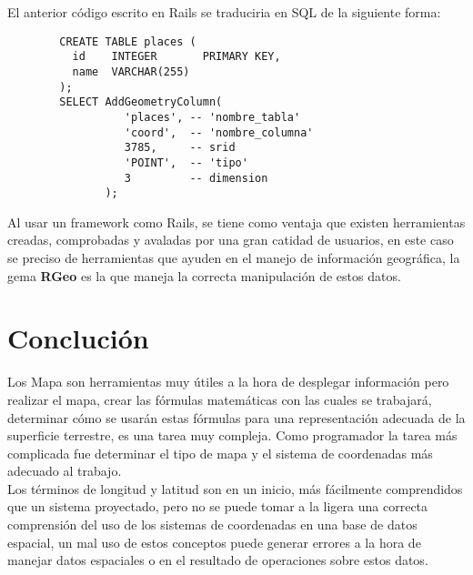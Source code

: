     El anterior código escrito en Rails se traduciria en SQL de la siguiente forma: 
    \begin{center}
      \begin{verbatim}
        CREATE TABLE places (
          id    INTEGER       PRIMARY KEY,
          name  VARCHAR(255)
        );
        SELECT AddGeometryColumn(
                  'places', -- 'nombre_tabla'
                  'coord',  -- 'nombre_columna'
                  3785,     -- srid
                  'POINT',  -- 'tipo'
                  3         -- dimension
               );
      \end{verbatim}
    \end{center}
    Al usar un framework como Rails, se tiene como ventaja que existen herramientas creadas, comprobadas y avaladas por una gran catidad de usuarios, en este caso se preciso de herramientas que ayuden en el  manejo de informaci\'on geogr\'afica, la gema \textbf{RGeo} es la que maneja  la correcta manipulaci\'on de estos datos. 



  \section{Concluci\'on} %
  \label{sec:geo_conclucion}
    Los Mapa son herramientas muy útiles a la hora de desplegar información pero realizar el mapa, crear las fórmulas matemáticas con las cuales se trabajará, determinar cómo se usarán estas fórmulas para una representación adecuada de la superficie terrestre, es una tarea muy compleja. Como programador la tarea más complicada fue determinar el tipo de mapa y el sistema de coordenadas más adecuado al trabajo.\\

    Los términos de longitud y latitud son en un inicio, más fácilmente comprendidos que un sistema proyectado, pero no se puede tomar a la ligera una correcta comprensión del uso de los sistemas de coordenadas en una base de datos espacial, un mal uso de estos conceptos puede generar errores a la hora de manejar datos  espaciales o en el resultado de operaciones sobre estos  datos.





